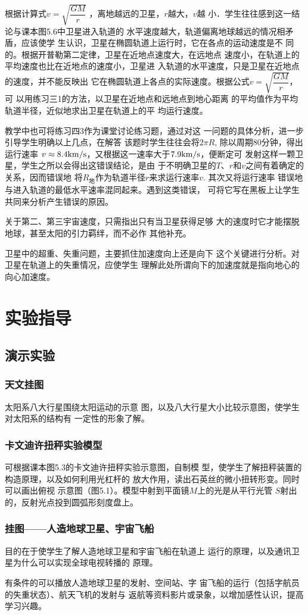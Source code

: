 根据计算式$v=\sqrt{\dfrac{GM}{r}}$
，离地越远的卫星，$r$越大，$v$越
小．学生往往感到这一结论与课本图5.6中卫星进入轨道的
水平速度越大，轨道偏离地球越远的情况相矛盾，应该使学
生认识，卫星在椭圆轨道上运行时，它在各点的运动速度是不
同的。根据开普勒第二定律，卫星在近地点速度大，在远地点
速度小，在轨道上的平均速度也比在近地点的速度小，卫星进
入轨道的水平速度，只是卫星在近地点的速度，并不能反映出
它在椭圆轨道上各点的实际速度。根据公式$v=\sqrt{\dfrac{GM}{r}}$，
可
以用练习三1的方法，以卫星在近地点和远地点到地心距离
的平均值作为平均轨道半径，近似地求出卫星在轨道上的平
均运行速度。

教学中也可将练习四3作为课堂讨论练习题，通过对这
一问题的具体分析，进一步引导学生明确以上几点，在解答
该题时学生往往会将$2\pi R$, 除以周期80分钟，得出运行速率
$v\approx 8.4{\rm km/s}$，又根据这一速率大于$7.9{\rm km/s}$，便断定可
发射这样一颗卫星，学生之所以会得出这错误结论，是由
于不明确卫星的$T$、$r$和$v$之间有着确定的关系，因而错误地
将$R_{\text{地}}$作为轨道半径$r$来求运行速率$v$. 其次又将运行速率
错误地与进入轨道的最低水平速率混同起来。遇到这类错误，
可将它写在黑板上让学生共同来分析产生错误的原因。

关于第二、第三宇宙速度，只需指出只有当卫星获得足够
大的速度时它才能摆脱地球，甚至太阳的引力羁绊，而不必作
其他补充。

卫星中的超重、失重问题，主要抓住加速度向上还是向下
这个关键进行分析。对卫星在轨道上的失重情况，应使学生
理解此处所谓向下的加速度就是指向地心的向心加速度。

\section{实验指导}
\subsection{演示实验}

\subsubsection{天文挂图}

太阳系八大行星围绕太阳运动的示意
图，以及八大行星大小比较示意图，使学生对太阳系的结构有
一定性的形象了解。

\subsubsection{卡文迪许扭秤实验模型}
可根据课本图5.3的卡文迪许扭秤实验示意图，自制模
型，使学生了解扭秤装置的构造原理，以及如何利用光杠杆的
放大作用，读出石英丝的微小扭转形变。同时可以画出俯视
示意图（图5.1）。模型中射到平面镜$M$上的光是从平行光管
$S$射出的，反射光点投到圆弧形刻度盘上。

\subsubsection{挂图——人造地球卫星、宇宙飞船}

目的在于使学生了解人造地球卫星和宇宙飞船在轨道上
运行的原理，以及通讯卫星为什么可以实现全球电视转播的
原理。

有条件的可以播放人造地球卫星的发射、空间站、字
宙飞船的运行（包括字航员的失重状态）、航天飞机的发射与
返航等资料影片或录象，以增加感性认识，提高学习兴趣。













